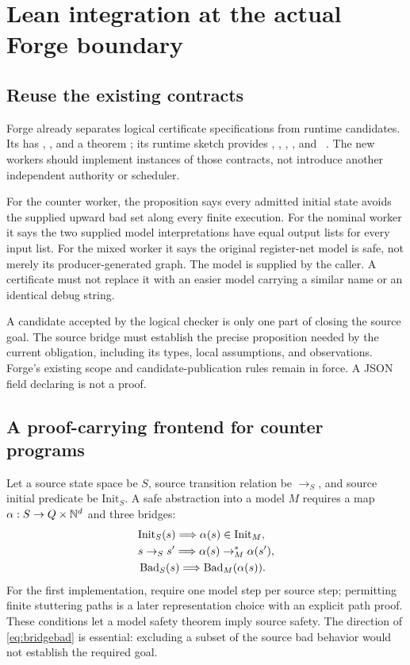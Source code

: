 \section{Lean integration at the actual Forge boundary}
\label{sec:integration}

\subsection{Reuse the existing contracts}
Forge already separates logical certificate specifications from runtime
candidates. Its  has ,
, and a theorem ; its runtime sketch provides
, , ,
, and ~\cite{forge-contracts,forge-runtime}.
The new workers should implement instances of those contracts, not introduce
another independent authority or scheduler.

For the counter worker, the  proposition says every admitted
initial state avoids the supplied upward bad set along every finite execution.
For the nominal worker it says the two supplied model interpretations have
equal output lists for every input list. For the mixed worker it says the
original register-net model is safe, not merely its producer-generated graph.
The model is supplied by the caller. A certificate must not replace it with an
easier model carrying a similar name or an identical debug string.

A candidate accepted by the logical checker is only one part of closing the
source goal. The source bridge must establish the precise proposition needed
by the current obligation, including its types, local assumptions, and
observations. Forge's existing scope and candidate-publication rules remain in
force. A JSON field declaring  is not a  proof.

\subsection{A proof-carrying frontend for counter programs}
Let a source state space be $S$, source transition relation be $\to_S$, and
source initial predicate be $\mathrm{Init}_S$. A safe abstraction into a model
$M$ requires a map $\alpha:S\to Q\times\mathbb N^d$ and three bridges:
\begin{align}
 &\mathrm{Init}_S(s)\Longrightarrow\alpha(s)\in\mathrm{Init}_M,
 \label{eq:bridgeinit}\\
 &s\to_S s'\Longrightarrow\alpha(s)\to_M^*\alpha(s'),
 \label{eq:bridgestep}\\
 &\operatorname{Bad}_S(s)\Longrightarrow\operatorname{Bad}_M(\alpha(s)).
 \label{eq:bridgebad}
\end{align}
For the first implementation, require one model step per source step; permitting
finite stuttering paths is a later representation choice with an explicit
path proof. These conditions let a model safety theorem imply source safety.
The direction of \eqref{eq:bridgebad} is essential: excluding a subset of the
source bad behavior would not establish the required goal.


